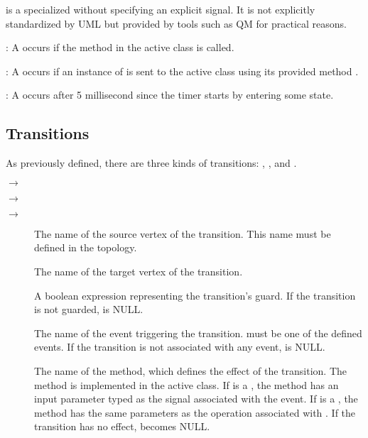  is a specialized  without specifying an explicit signal.
It is not explicitly standardized by UML but provided by tools such as QM \cite{qm} for practical reasons. 

\noindent
{}

: A  occurs if the method  in the active class is called.

: A  occurs if an instance of  is sent to the active class using its provided method .

: A  occurs after 5 millisecond since the timer starts by entering some state.

\subsection{Transitions}
As previously defined, there are three kinds of transitions: , , and .

\noindent
{}

\noindent
{} $\rightarrow$  

\noindent
{}$\rightarrow$

\noindent
{} $\rightarrow$ 

\noindent
{}
\begin{description}
	\item[] The name of the source vertex of the transition. 
	This name must be defined in the topology.
	
	\item[] The name of the target vertex of the transition. 
	
	\item[] A boolean expression representing the transition's guard. If the transition is not guarded,  is NULL.
	
	\item[] The name of the event triggering the transition. 
	 must be one of the defined events. 
	If the transition is not associated with any event,  is NULL.
	
	\item[] The name of the method, which defines the effect of the transition.
	The method is implemented in the active class.
	If  is a , the method has an input parameter typed as the signal associated with the event.
	If  is a , the method has the same parameters as the operation associated with .
	If the transition has no effect,  becomes NULL.
\end{description}

